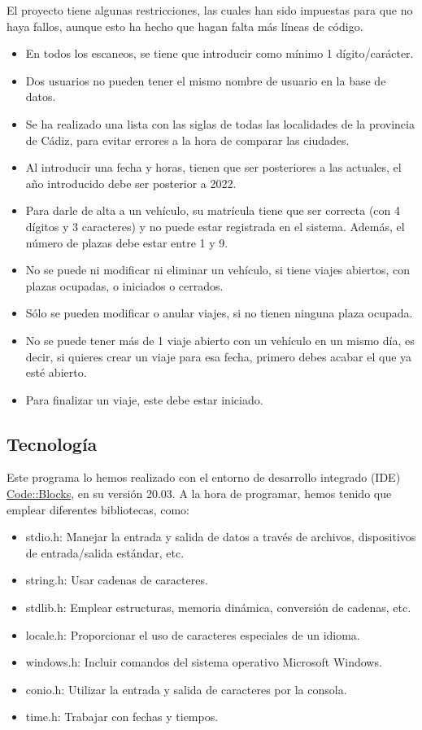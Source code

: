 El proyecto tiene algunas restricciones, las cuales han sido impuestas para que no haya fallos, aunque esto ha hecho que hagan falta más líneas de código.
\begin{itemize}
  \item En todos los escaneos, se tiene que introducir como mínimo 1 dígito/carácter.
  \item Dos usuarios no pueden tener el mismo nombre de usuario en la base de datos.
  \item Se ha realizado una lista con las siglas de todas las localidades de la provincia de Cádiz, para evitar errores a la hora de comparar las ciudades.
  \item Al introducir una fecha y horas, tienen que ser posteriores a las actuales, el año introducido debe ser posterior a 2022.
  \item Para darle de alta a un vehículo, su matrícula tiene que ser correcta (con 4 dígitos y 3 caracteres) y no puede estar registrada en el sistema. Además, el número de plazas debe estar entre 1 y 9.
  \item No se puede ni modificar ni eliminar un vehículo, si tiene viajes abiertos, con plazas ocupadas, o iniciados o cerrados.
  \item Sólo se pueden modificar o anular viajes, si no tienen ninguna plaza ocupada.
  \item No se puede tener más de 1 viaje abierto con un vehículo en un mismo día, es decir, si quieres crear un viaje para esa fecha, primero debes acabar el que ya esté abierto.
  \item Para finalizar un viaje, este debe estar iniciado.
\end{itemize}
\label{fig:Limitaciones}

\subsection{Tecnología}

Este programa lo hemos realizado con el entorno de desarrollo integrado (IDE) \href{https://www.codeblocks.org/}{Code::Blocks}, en su versión 20.03.
A la hora de programar, hemos tenido que emplear diferentes bibliotecas, como:
\begin{itemize}
  \item stdio.h: Manejar la entrada y salida de datos a través de archivos, dispositivos de entrada/salida estándar, etc.
  \item string.h: Usar cadenas de caracteres.
  \item stdlib.h: Emplear estructuras, memoria dinámica, conversión de cadenas, etc.
  \item locale.h: Proporcionar el uso de caracteres especiales de un idioma.
  \item windows.h: Incluir comandos del sistema operativo Microsoft Windows.
  \item conio.h: Utilizar la entrada y salida de caracteres por la consola.
  \item time.h: Trabajar con fechas y tiempos.
\end{itemize}

